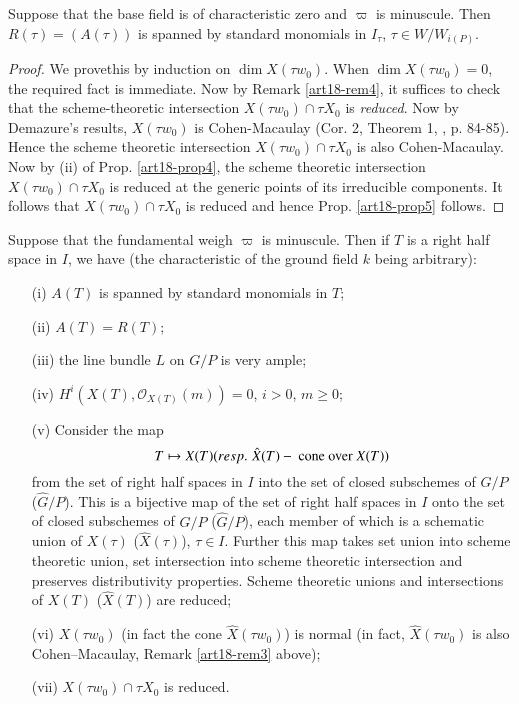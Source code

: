 \begin{prop}\label{art18-prop5}
Suppose that the base field is of characteristic zero and $\varpi$ is minuscule. Then $R(\tau) = (A(\tau))$ is spanned by standard monomials in $I_\tau$, $\tau \in W / W_{i(P)}$.
\end{prop}

\begin{proof}
We prove\pageoriginale this by induction on $\dim X(\tau w_0)$. When $\dim X(\tau w_0) =0$, the required fact is immediate. Now by Remark \ref{art18-rem4}, it suffices to check that the scheme-theoretic intersection $X(\tau w_0) \cap \tau X_0$ is {\em reduced}. Now by Demazure's results, $X(\tau w_0)$ is Cohen-Macaulay (\cf Cor. 2, Theorem 1, \cite{art18-key8}, p. 84-85). Hence the scheme theoretic intersection $X(\tau w_0) \cap \tau X_0$ is also Cohen-Macaulay. Now by (ii) of Prop. \ref{art18-prop4}, the scheme theoretic intersection $X(\tau w_0) \cap \tau X_0$ is reduced at the generic points of its irreducible components. It follows that $X(\tau w_0) \cap\tau X_0$ is reduced and hence Prop. \ref{art18-prop5} follows.
\end{proof}

\begin{theorem}\label{art18-thm1}
Suppose that the fundamental weigh $\varpi$ is minuscule. Then if $T$ is a right half space in $I$, we have (the characteristic of the ground field $k$ being arbitrary):
\begin{itemize}
\item[(i)] $A(T)$ is spanned by standard monomials in $T$;

\item[(ii)] $A(T) = R(T)$;

\item[(iii)] the line bundle $L$ on $G/P$ is very ample;

\item[(iv)] $H^i (X (T), \mathscr{O}_{X(T)} (m)) =0$, $i>0$, $m \geqslant 0$;

\item[(v)] Consider the map
$$
T \mapsto X(T) ({resp.}\kern.3em \hat{X}(T) - \text{~ cone over ~} X(T))
$$
from the set of right half spaces in $I$ into the set of closed subschemes of $G/P$ (\resp $\hat{G}/P$). This is a bijective map of the set of right half spaces in $I$ onto the set of closed subschemes of $G/P$ (\resp $\hat{G}/P$), each member of which is a schematic union of $X(\tau)$ (\resp $\hat{X}(\tau)$), $\tau \in I$. Further this map takes set union into scheme theoretic union, set intersection into scheme theoretic intersection and preserves distributivity properties. Scheme theoretic unions and intersections of $X(T)$ (\resp $\hat{X}(T)$) are reduced;

\item[(vi)] $X(\tau w_0)$ (in fact the cone $\hat{X}(\tau w_0)$) is normal (in fact, $\hat{X}(\tau w_0)$ is also Cohen--Macaulay, \cf Remark \ref{art18-rem3} above);

\item[(vii)] $X(\tau w_0) \cap \tau X_0$ is reduced.
\end{itemize}
\end{theorem}

